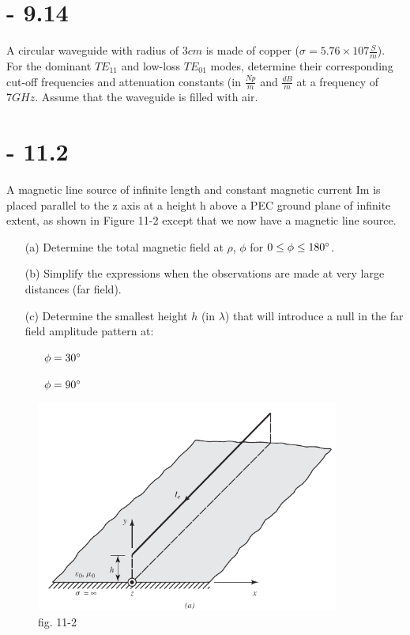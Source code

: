 \documentclass[12pt]{article}
\begin{document}
\section{- 9.14}
A circular waveguide with radius of $3 cm$ is made of copper ($\sigma = 5.76 × 107 \frac{S}{m}$). For the dominant $TE_{11}$ and low-loss $TE_{01}$ modes, determine their corresponding cut-off frequencies and attenuation constants (in $\frac{Np}{m}$ and $\frac{dB}{m}$ at a frequency of $7 GHz$. Assume that the waveguide is filled with air.
\newpage
\section{- 11.2}
A magnetic line source of infinite length and constant magnetic current Im is placed parallel to the z axis at a height h above a PEC ground plane of infinite extent, as shown in Figure 11-2 except that we now have a magnetic line source.
\begin{itemize}
\item[(a)] Determine the total magnetic field at $\rho$, $\phi$ for $0\le \phi \le 180\degree$.
\item[(b)] Simplify the expressions when the observations are made at very large distances (far field).
\item[(c)] Determine the smallest height $h$ (in $\lambda$) that will introduce a null in the far field amplitude pattern at:
  \begin{itemize}
  \item[\cdot] $\phi = 30\degree$
  \item[\cdot] $\phi = 90\degree$
  \end{itemize}
\end{itemize}
\begin{center}
\begin{figure}[h]
    \centering
    \includegraphics[width=10cm]{./images/fig11-2.png}
    \caption{fig. 11-2}
    \label{fig:11-2}
  \end{figure}
\end{center}
\end{document}
